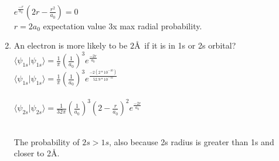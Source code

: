 \documentclass{article}
\begin{document}
\begin{enumerate}
\\ $e^\frac{-r}{a_0}(2r-\frac{r^2}{a_0})=0$
\\ $r=2a_0$ expectation value 3x max radial probability.
\item An electron is more likely to be $2$\AA~if it is in 1s or 2s orbital?
\\ $\langle \psi_{1s}|\psi_{1s}\rangle = \frac{1}{\pi}\left(\frac{1}{a_0}\right)^3e^\frac{-2r}{a_0}$
\\ $\langle \psi_{1s}|\psi_{1s}\rangle = \frac{1}{\pi}\left(\frac{1}{a_0}\right)^3e^\frac{-2(2*10^{-10})}{52.9*10^{-12}}$
\\
\\ $\langle \psi_{2s}|\psi_{2s}\rangle =  \frac{1}{32\pi}\left(\frac{1}{a_0}\right)^3(2-\frac{r}{a_0})^2e^\frac{-2r}{a_0}$

\\ The probability of $2s > 1s$, also because 2s radius is greater than 1s and closer to 2\AA. 

\end{enumerate}%
\end{document}
